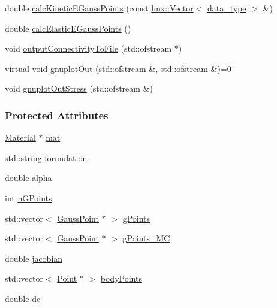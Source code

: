 \begin{DoxyCompactItemize}
\item 
double \hyperlink{classmknix_1_1_cell_aa0b40b9534a376333490fe73d921e552}{calc\+Kinetic\+E\+Gauss\+Points} (const \hyperlink{classlmx_1_1_vector}{lmx\+::\+Vector}$<$ \hyperlink{namespacemknix_a16be4b246fbf2cceb141e3a179111020}{data\+\_\+type} $>$ \&)
\item 
double \hyperlink{classmknix_1_1_cell_a1b59c56aa8983a27571c6809b03604c5}{calc\+Elastic\+E\+Gauss\+Points} ()
\item 
void \hyperlink{classmknix_1_1_cell_ab004ce4e03c629bd57a457e0a74f4d8b}{output\+Connectivity\+To\+File} (std\+::ofstream $\ast$)
\item 
virtual void \hyperlink{classmknix_1_1_cell_a345a938d058d10f60d6c302a715290de}{gnuplot\+Out} (std\+::ofstream \&, std\+::ofstream \&)=0
\item 
void \hyperlink{classmknix_1_1_cell_a6dd6795d452d5bd8ff26de1419baef31}{gnuplot\+Out\+Stress} (std\+::ofstream \&)
\end{DoxyCompactItemize}
\subsubsection*{Protected Attributes}
\begin{DoxyCompactItemize}
\item 
\hyperlink{classmknix_1_1_material}{Material} $\ast$ \hyperlink{classmknix_1_1_cell_a83ca13ff89196b3ab378d2a28820a08e}{mat}
\item 
std\+::string \hyperlink{classmknix_1_1_cell_ad637a730575145fbc61f884b2edac8f8}{formulation}
\item 
double \hyperlink{classmknix_1_1_cell_a79afef7ecbdfee69e687bb2e7559520b}{alpha}
\item 
int \hyperlink{classmknix_1_1_cell_a7d406d6e6f58c14da07387723986ae38}{n\+G\+Points}
\item 
std\+::vector$<$ \hyperlink{classmknix_1_1_gauss_point}{Gauss\+Point} $\ast$ $>$ \hyperlink{classmknix_1_1_cell_a980ae62ad7e6dda296257455ee173f86}{g\+Points}
\item 
std\+::vector$<$ \hyperlink{classmknix_1_1_gauss_point}{Gauss\+Point} $\ast$ $>$ \hyperlink{classmknix_1_1_cell_a45f0c5d52208a6166a71e05b190ece44}{g\+Points\+\_\+\+M\+C}
\item 
double \hyperlink{classmknix_1_1_cell_a4922bf34ba543606a8d9c5ca4847b589}{jacobian}
\item 
std\+::vector$<$ \hyperlink{classmknix_1_1_point}{Point} $\ast$ $>$ \hyperlink{classmknix_1_1_cell_a3b99f21386f177893f32289c95df4684}{body\+Points}
\item 
double \hyperlink{classmknix_1_1_cell_a7108fef12b0319adebeff93cab664314}{dc}
\end{DoxyCompactItemize}



